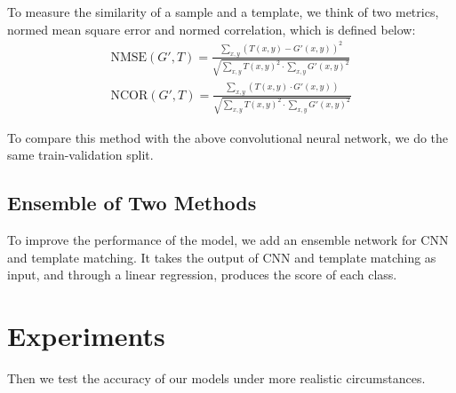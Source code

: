 \documentclass[journal]{IEEEtran}
\begin{document}
To measure the similarity of a sample and a template, we think of two metrics, normed mean square error and normed correlation, which is defined below:
\begin{align*}
	\text{NMSE}(G',T)= \frac{\sum_{x,y} (T(x,y)-G'(x,y))^2}{\sqrt{\sum_{x,y}T(x,y)^2 \cdot \sum_{x,y} G'(x,y)^2}} \\
	\text{NCOR}(G',T)= \frac{\sum_{x,y} (T(x,y) \cdot G'(x,y))}{\sqrt{\sum_{x,y}T(x,y)^2 \cdot \sum_{x,y} G'(x,y)^2}}
\end{align*}

To compare this method with the above convolutional neural network, we do the same train-validation split.

\subsection{Ensemble of Two Methods}
To improve the performance of the model, we add an ensemble network for CNN and template matching. It takes the output of CNN and template matching as input, and through a linear regression, produces the score of each class. 

\section{Experiments}
Then we test the accuracy of our models under more realistic circumstances.
\end{document}
